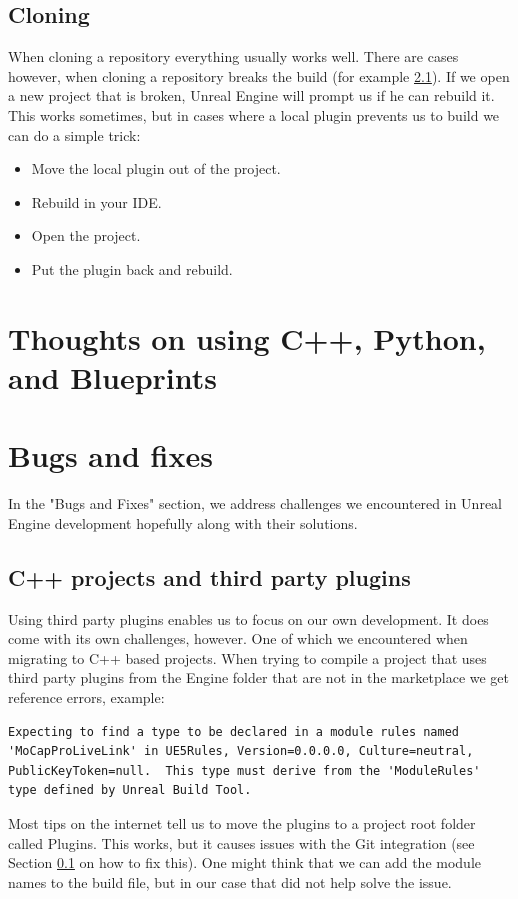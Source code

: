 \documentclass{uva-inf-article}
\begin{document}
\subsection{Cloning}\label{cloning}
When cloning a repository everything usually works well. There are cases however, when cloning a repository breaks the build (for example \ref{cppThirdPartyPluginsBug}).
If we open a new project that is broken, Unreal Engine will prompt us if he can rebuild it. This works sometimes, but in cases where a local plugin prevents us to build we can do a simple trick:
\begin{itemize}
    \item Move the local plugin out of the project.
    \item Rebuild in your IDE.
    \item Open the project.
    \item Put the plugin back and rebuild.
\end{itemize}

\section{Thoughts on using C++, Python, and Blueprints}

\section{Bugs and fixes}
In the "Bugs and Fixes" section, we address challenges we encountered in Unreal Engine development hopefully along with their solutions.

\subsection{C++ projects and third party plugins}\label{cppThirdPartyPluginsBug}
Using third party plugins enables us to focus on our own development. It does come with its own challenges, however. One of which we encountered when migrating to C++ based projects. When trying to compile a project that uses third party plugins from the Engine folder that are not in the marketplace we get reference errors, example:
\begin{lstlisting}
Expecting to find a type to be declared in a module rules named 'MoCapProLiveLink' in UE5Rules, Version=0.0.0.0, Culture=neutral, PublicKeyToken=null.  This type must derive from the 'ModuleRules' type defined by Unreal Build Tool.
\end{lstlisting}
Most tips on the internet tell us to move the plugins to a project root folder called Plugins. This works, but it causes issues with the Git integration (see Section \ref{cloning} on how to fix this). One might think that we can add the module names to the build file, but in our case that did not help solve the issue.
\end{document}
